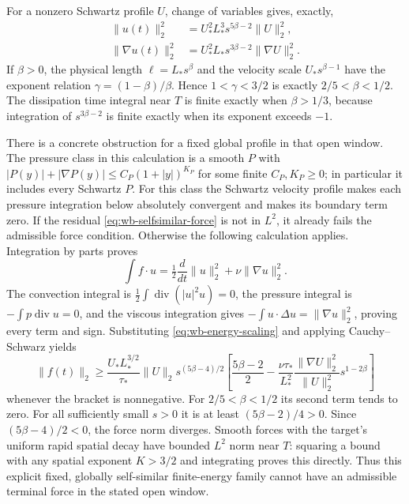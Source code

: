 For a nonzero Schwartz profile $U$, change of variables gives, exactly,
\begin{align}
 \|u(t)\|_2^2&=U_*^2L_*^3s^{5\beta-2}\|U\|_2^2,\\
 \|\nabla u(t)\|_2^2&=U_*^2L_*s^{3\beta-2}\|\nabla U\|_2^2.
 \label{eq:wb-energy-scaling}
\end{align}
If $\beta>0$, the physical length $\ell=L_*s^\beta$ and the
velocity scale $U_*s^{\beta-1}$ have the exponent relation
$\gamma=(1-\beta)/\beta$. Hence
$1<\gamma<3/2$ is exactly $2/5<\beta<1/2$.
The dissipation time integral near $T$ is finite exactly when
$\beta>1/3$, because integration of $s^{3\beta-2}$ is finite
exactly when its exponent exceeds $-1$.

There is a concrete obstruction for a fixed global profile in that open
window. The pressure class in this calculation is a smooth $P$ with
$|P(y)|+|\nabla P(y)|\leq C_P(1+|y|)^{K_P}$ for some finite
$C_P,K_P\geq0$; in particular it includes every Schwartz $P$.
For this class the Schwartz velocity profile makes each pressure
integration below absolutely convergent and makes its boundary term
zero. If the residual \eqref{eq:wb-selfsimilar-force} is not in $L^2$,
it already fails the admissible force condition. Otherwise the following
calculation applies. Integration by parts proves
\[
 \int f\cdot u=\tfrac12\frac d{dt}\|u\|_2^2
                         +\nu\|\nabla u\|_2^2.
\]
The convection integral is
$\frac12\int\operatorname{div}(|u|^2u)=0$, the pressure integral
is $-\int p\operatorname{div}u=0$, and the viscous integration
gives $-\int u\cdot\Delta u=\|\nabla u\|_2^2$, proving every
term and sign. Substituting \eqref{eq:wb-energy-scaling} and applying
Cauchy--Schwarz yields
\begin{equation}
 \|f(t)\|_2\geq
 \frac{U_*L_*^{3/2}}{\tau_*}\|U\|_2
 s^{(5\beta-4)/2}
 \left[\frac{5\beta-2}{2}
 -\frac{\nu\tau_*}{L_*^2}
 \frac{\|\nabla U\|_2^2}{\|U\|_2^2}s^{1-2\beta}\right]
 \label{eq:wb-force-lower}
\end{equation}
whenever the bracket is nonnegative. For $2/5<\beta<1/2$ its
second term tends to zero. For all sufficiently small $s>0$ it is
at least $(5\beta-2)/4>0$. Since $(5\beta-4)/2<0$, the force
norm diverges. Smooth forces with the target's uniform rapid spatial
decay have bounded $L^2$ norm near $T$: squaring a bound with any
spatial exponent $K>3/2$ and integrating proves this directly.
Thus this explicit fixed, globally self-similar finite-energy family
cannot have an admissible terminal force in the stated open window.

